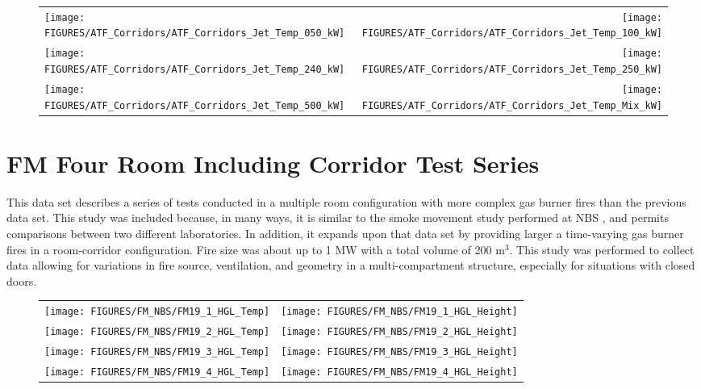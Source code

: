 \begin{figure}
\begin{tabular*}{\textwidth}{l@{\extracolsep{\fill}}r}
\texttt{[image: FIGURES/ATF\_Corridors/ATF\_Corridors\_Jet\_Temp\_050\_kW]} &
\texttt{[image: FIGURES/ATF\_Corridors/ATF\_Corridors\_Jet\_Temp\_100\_kW]} \\
\texttt{[image: FIGURES/ATF\_Corridors/ATF\_Corridors\_Jet\_Temp\_240\_kW]} &
\texttt{[image: FIGURES/ATF\_Corridors/ATF\_Corridors\_Jet\_Temp\_250\_kW]} \\
\texttt{[image: FIGURES/ATF\_Corridors/ATF\_Corridors\_Jet\_Temp\_500\_kW]} &
\texttt{[image: FIGURES/ATF\_Corridors/ATF\_Corridors\_Jet\_Temp\_Mix\_kW]}
\end{tabular*}
\end{figure}

\clearpage

\section{FM Four Room Including Corridor Test Series}

This data set describes a series of tests conducted in a multiple room configuration with more complex gas burner fires than the previous data set.  This study \cite{Heskestad:1986} was included because, in many ways, it is similar to the smoke movement study performed at NBS \cite{Peacock:1988}, and permits comparisons between two different laboratories. In addition, it expands upon that data set by providing larger a time-varying gas burner fires in a room-corridor configuration. Fire size was about up to 1 MW with a total volume of 200 m$^3$. This study was performed to collect data allowing for variations in fire source, ventilation, and geometry in a multi-compartment structure, especially for situations with closed doors.

\begin{figure}[p]
\begin{tabular*}{\textwidth}{l@{\extracolsep{\fill}}r}
\texttt{[image: FIGURES/FM\_NBS/FM19\_1\_HGL\_Temp]} &
\texttt{[image: FIGURES/FM\_NBS/FM19\_1\_HGL\_Height]} \\
\texttt{[image: FIGURES/FM\_NBS/FM19\_2\_HGL\_Temp]} &
\texttt{[image: FIGURES/FM\_NBS/FM19\_2\_HGL\_Height]} \\
\texttt{[image: FIGURES/FM\_NBS/FM19\_3\_HGL\_Temp]} &
\texttt{[image: FIGURES/FM\_NBS/FM19\_3\_HGL\_Height]} \\
\texttt{[image: FIGURES/FM\_NBS/FM19\_4\_HGL\_Temp]} &
\texttt{[image: FIGURES/FM\_NBS/FM19\_4\_HGL\_Height]} \\
\end{tabular*}
\end{figure}


